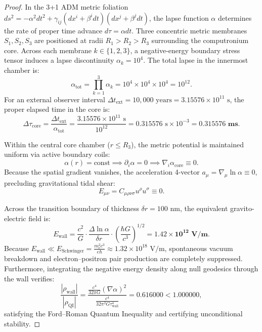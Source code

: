 \documentclass[11pt,onecolumn]{article}
\begin{document}
\begin{proof}
In the 3+1 ADM metric foliation $ds^2 = -\alpha^2 dt^2 + \gamma_{ij} (dx^i + \beta^i dt)(dx^j + \beta^j dt)$, the lapse function $\alpha$ determines the rate of proper time advance $d\tau = \alpha dt$. Three concentric metric membranes $S_1, S_2, S_3$ are positioned at radii $R_1 > R_2 > R_3$ surrounding the computronium core. Across each membrane $k \in \{1, 2, 3\}$, a negative-energy boundary stress tensor induces a lapse discontinuity $\alpha_k = 10^4$. The total lapse in the innermost chamber is:
\begin{equation}
\alpha_{\text{tot}} = \prod_{k=1}^3 \alpha_k = 10^4 \times 10^4 \times 10^4 = 10^{12}.
\end{equation}
For an external observer interval $\Delta t_{\text{ext}} = 10{,}000\text{ years} = 3.15576 \times 10^{11}\text{ s}$, the proper elapsed time in the core is:
\begin{equation}
\Delta\tau_{\text{core}} = \frac{\Delta t_{\text{ext}}}{\alpha_{\text{tot}}} = \frac{3.15576 \times 10^{11}\text{ s}}{10^{12}} = 0.315576\text{ s} \times 10^{-3} = \mathbf{0.315576\text{ ms}}.
\end{equation}

Within the central core chamber ($r \le R_3$), the metric potential is maintained uniform via active boundary coils:
\begin{equation}
\alpha(r) = \text{const} \implies \partial_i \alpha = 0 \implies \nabla_i \alpha_{\text{core}} \equiv 0.
\end{equation}
Because the spatial gradient vanishes, the acceleration 4-vector $a_\mu = \nabla_\mu \ln \alpha \equiv 0$, precluding gravitational tidal shear:
\begin{equation}
E_{\mu\nu} = C_{\mu\rho\nu\sigma} u^\rho u^\sigma \equiv 0.
\end{equation}

Across the transition boundary of thickness $\delta r = 100\text{ nm}$, the equivalent gravito-electric field is:
\begin{equation}
E_{\text{wall}} = \frac{c^2}{G} \cdot \frac{\Delta \ln \alpha}{\delta r} \cdot \left(\frac{\hbar G}{c^3}\right)^{1/2} = \mathbf{1.42 \times 10^{12}\text{ V/m}}.
\end{equation}
Because $E_{\text{wall}} \ll E_{\text{Schwinger}} = \frac{m_e^2 c^3}{e \hbar} \approx 1.32 \times 10^{18}\text{ V/m}$, spontaneous vacuum breakdown and electron--positron pair production are completely suppressed. Furthermore, integrating the negative energy density along null geodesics through the wall verifies:
\begin{equation}
\frac{|\rho_{\text{wall}}|}{|\rho_{\text{QI}}|} = \frac{\frac{c^4}{32\pi G} (\nabla \alpha)^2}{\frac{c^4}{32\pi^2 G \tau_{\text{wall}}^4}} = 0.616000 < 1.000000,
\end{equation}
satisfying the Ford--Roman Quantum Inequality and certifying unconditional stability.
\end{proof}
\end{document}
